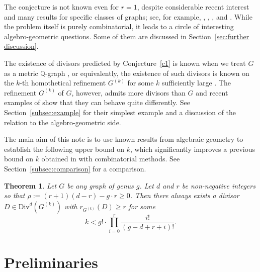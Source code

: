 \documentclass[11pt]{amsart}
\newtheorem{theorem}{Theorem}
\begin{document}
The conjecture is not known even for $r = 1$, despite considerable recent interest and many results for specific classes of graphs; see, for example, \cite{MR2895184}, \cite{MR3770859}, \cite{M22}, \cite{MR4397104} and \cite{MR4492530}. While the problem itself is purely combinatorial, it leads to a circle of interesting algebro-geometric questions. Some of them are discussed in Section~\ref{sec:further discussion}.

The existence of divisors predicted by Conjecture~\ref{c1} is known when we treat $G$ as a metric $\mathbb{Q}$-graph \cite[Theorem 3.12]{MR2448666}, or equivalently, the existence of such divisors is known on the $k$-th homothetical refinement $G^{(k)}$ for some $k$ sufficiently large \cite[Theorem 1.3]{MR3092681}. The refinement $G^{(k)}$ of $G$, however, admits more divisors than $G$ and recent examples of \cite{MR4397104} show that they can behave quite differently. See Section~\ref{subsec:example} for their simplest example and a discussion of the relation to the algebro-geometric side. 

The main aim of this note is to use known results from algebraic geometry to establish the following upper bound on $k$, which significantly improves a previous bound on $k$ obtained in \cite{MR4397104} with combinatorial methods. See Section~\ref{subsec:comparison} for a comparison.
\begin{theorem}\label{main}
 Let $G$ be any graph of genus $g$. Let $d$ and $r$ be non-negative integers so that $\rho:=(r+1)(d-r)-g\cdot r\geq0$. Then there always exists a divisor $D\in \mathrm{Div}^d(G^{(k)})$  with $r_{G^{(k)}}(D)\geq r$
  for some \begin{equation*}\label{eq:bound}
      k < g!\cdot \prod_{i=0}^r \frac{i!}{(g-d+r+i)!}.
  \end{equation*}
\end{theorem}



\section{Preliminaries}
\end{document}
